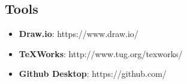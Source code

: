 \documentclass[12pt,a4paper]{article}
\begin{document}
\subsection{Tools}
\begin{itemize}
\item \textbf{Draw.io}: https://www.draw.io/
\item \textbf{TeXWorks}: http://www.tug.org/texworks/
\item \textbf{Github Desktop}: https://github.com/
\end{itemize}
\end{document}
